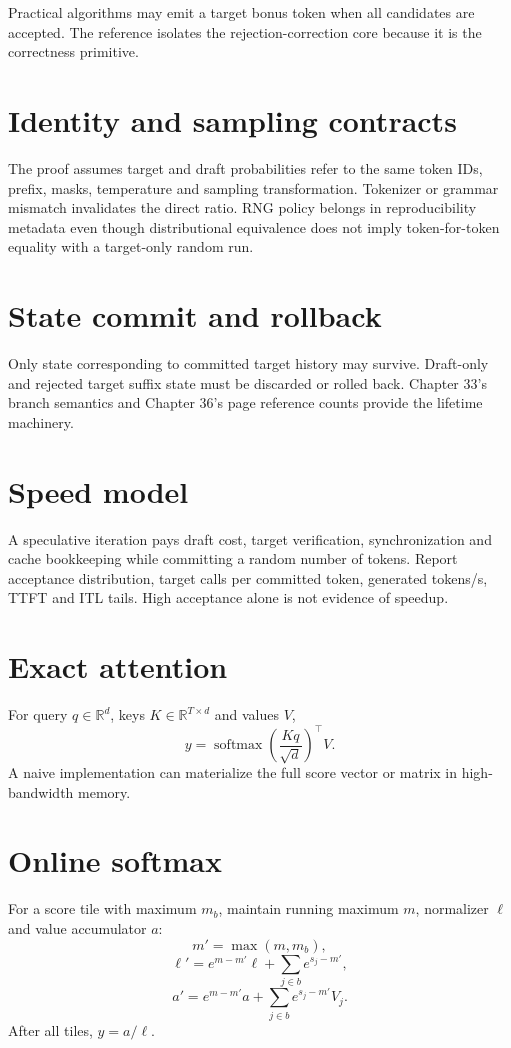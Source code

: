 Practical algorithms may emit a target bonus token when all candidates are accepted. The reference isolates the rejection-correction core because it is the correctness primitive.

\section{Identity and sampling contracts}
The proof assumes target and draft probabilities refer to the same token IDs, prefix, masks, temperature and sampling transformation. Tokenizer or grammar mismatch invalidates the direct ratio. RNG policy belongs in reproducibility metadata even though distributional equivalence does not imply token-for-token equality with a target-only random run.

\section{State commit and rollback}
Only state corresponding to committed target history may survive. Draft-only and rejected target suffix state must be discarded or rolled back. Chapter 33's branch semantics and Chapter 36's page reference counts provide the lifetime machinery.

\section{Speed model}
A speculative iteration pays draft cost, target verification, synchronization and cache bookkeeping while committing a random number of tokens. Report acceptance distribution, target calls per committed token, generated tokens/s, TTFT and ITL tails. High acceptance alone is not evidence of speedup.

\section{Exact attention}
For query $q\in\mathbb R^d$, keys $K\in\mathbb R^{T\times d}$ and values $V$,
\[
y=\operatorname{softmax}\left(\frac{Kq}{\sqrt d}\right)^\top V.
\]
A naive implementation can materialize the full score vector or matrix in high-bandwidth memory.

\section{Online softmax}
For a score tile with maximum $m_b$, maintain running maximum $m$, normalizer $\ell$ and value accumulator $a$:
\[
m'=\max(m,m_b),
\]
\[
\ell'=e^{m-m'}\ell+\sum_{j\in b}e^{s_j-m'},
\]
\[
a'=e^{m-m'}a+\sum_{j\in b}e^{s_j-m'}V_j.
\]
After all tiles, $y=a/\ell$.

